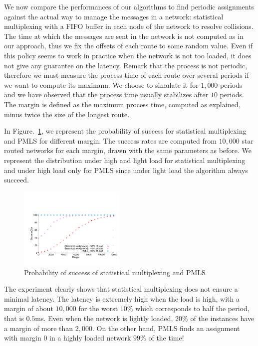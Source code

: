 \documentclass[a4paper,10pt]{IEEEtran}
\begin{document}
    We now compare the performances of our algorithms to find periodic assignments against the actual way to manage the messages in a network:  statistical multiplexing with a FIFO buffer in each node of the network to resolve collisions. The time at which the messages are sent in the network is not computed as in our approach, thus we fix the offsets of each route to some random value.
     Even if this policy seems to work in practice when the network is not too loaded, it does not give any guarantee on the latency. Remark that the process is not periodic, therefore we must measure the process time of each route over several periods if we want to compute its maximum. We choose to simulate it for $1,000$ periods and we have observed that the process time usually stabilizes after $10$ periods. The margin is defined as the maximum process time, computed as explained, minus twice the size of the longest route. 
	    
     In Figure.~\ref{fig:sto}, we represent the probability of success for statistical multiplexing and PMLS for different margin. The success rates are computed from $10,000$ star routed networks for each margin, drawn with the same parameters as before. We represent the distribution under high and light load for statistical multiplexing and under high load only for PMLS since under light load the algorithm always succeed. 
     

    \begin{figure}
       \begin{center}
      \includegraphics[width = 0.45\textwidth]{stochastic.pdf}
      \end{center}
      \caption{Probability of success of statistical multiplexing and PMLS}
      \label{fig:sto}   
     \end{figure}    
 
     The experiment clearly shows that statistical multiplexing does not ensure a minimal latency. 
     The latency is extremely high when the load is high, with a margin of about $10,000$ for the worst $10\%$ which corresponds to half the period, that is $0.5$ms. Even when the network is lightly loaded, $20\%$ of the instances have a margin of more than $2,000$. On the other hand, PMLS finds an assignment with margin $0$ in a highly loaded network $99\%$ of the time! 
\end{document}
